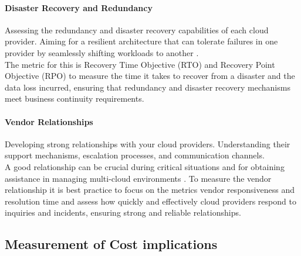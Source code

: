 \paragraph{Disaster Recovery and Redundancy}
Assessing the redundancy and disaster recovery capabilities of each cloud provider. 
Aiming for a resilient architecture that can tolerate failures in one provider by 
seamlessly shifting workloads to another \cite{DisasterRecoverySinglecloud}.\\
The metric for this is Recovery Time Objective (RTO) and Recovery Point Objective (RPO)
to measure the time it takes to recover from a disaster and the data loss incurred, 
ensuring that redundancy and disaster recovery mechanisms meet business continuity requirements.


\paragraph{Vendor Relationships}
Developing strong relationships with your cloud providers. 
Understanding their support mechanisms, escalation processes, and communication channels. \\
A good relationship can be crucial during critical situations and for obtaining assistance in 
managing multi-cloud environments \cite{islamCloudComputingSurvey2013}.
To measure the vendor relationship it is best practice to focus on the
metrics vendor responsiveness and resolution time and assess how quickly and effectively cloud providers respond to inquiries and incidents, 
ensuring strong and reliable relationships.


\subsection{Measurement of Cost implications}

